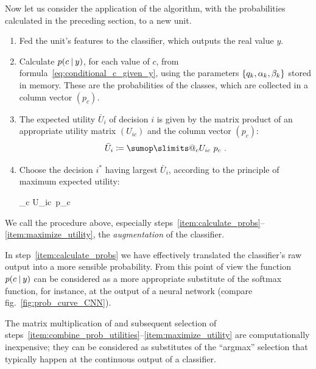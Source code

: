 \documentclass[a4paper,12pt,%
onecolumn,oneside,article,%
british%
]{memoir}
\makeatletter
\newcommand*{\widefbox}[1]{\fbox{\hspace{1em}#1\hspace{1em}}}
\def\sum{\DOTSI\sumop\slimits@}
\newcommand*{\defd}{\coloneqq}
\DeclarePairedDelimiter\set{\{}{\}} %
\renewcommand*{\|}[1][]{\nonscript\:#1\vert\nonscript\:\mathopen{}}
\newcommand*{\fig}{fig.}%
\DeclareMathOperator*{\argmax}{arg\,max}
\newcommand*{\eu}{\bar{U}}
\makeatother
\begin{document}
\medskip

Now let us consider the application of the algorithm, with the probabilities calculated in the preceding section, to a new unit.

\begin{enumerate}[label=\arabic*.]
\item Fed the unit's features to the classifier, which outputs the real value $y$.

\item\label{item:calculate_probs} Calculate $p(c \| y)$, for each value of $c$, from formula~\eqref{eq:conditional_c_given_y}, using the parameters $\set{q_{k}, \alpha_{k}, \beta_{k}}$ stored in memory. These are the probabilities of the classes, which are collected in a column vector $(p_{c})$.

\item\label{item:combine_prob_utilities} The expected utility $\eu_{i}$ of decision $i$ is given by the matrix product of an appropriate utility matrix $(U_{ic})$ and the column vector $(p_{c})$:
  \begin{equation}
    \label{eq:expe_utilities}
    \eu_{i} \defd \sum_{c} U_{ic}\ p_{c} \ .
  \end{equation}

\item\label{item:maximize_utility} Choose the decision $i^{*}$ having largest $\eu_{i}$, according to the principle of maximum expected utility:
  \begin{empheq}[box=\widefbox]{equation}
    \label{eq:max_expe_utility}
    \text{choose}\quad
    i^{*} = \argmax_{i}\set*{\eu_{i}} \equiv \argmax_{i}\set[\bigg]{\sum_{c} U_{ic}\ p_{c}}
  \end{empheq}
\end{enumerate}

\medskip

We call the procedure above, especially steps~\ref{item:calculate_probs}--\ref{item:maximize_utility}, the \emph{augmentation} of the classifier.

In step~\ref{item:calculate_probs} we have effectively translated the classifier's raw output into a more sensible probability. From this point of view the function $p(c \| y)$ can be considered as a more appropriate substitute of the softmax function, for instance, at the output of a neural network (compare \fig~\ref{fig:prob_curve_CNN}).

The matrix multiplication of and subsequent selection of steps~\ref{item:combine_prob_utilities}--\ref{item:maximize_utility} are computationally inexpensive; they can be considered as substitutes of the \enquote{argmax} selection that typically happen at the continuous output of a classifier.
\end{document}
